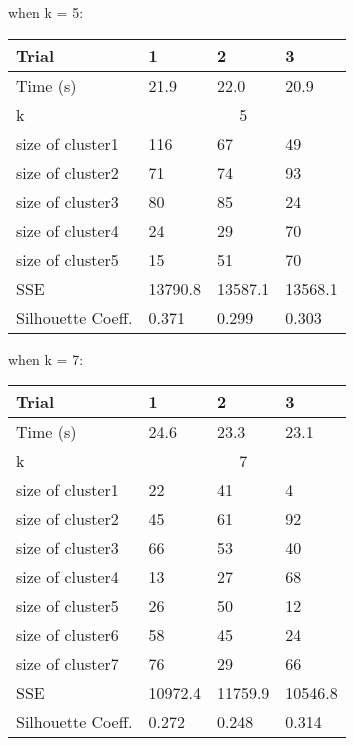 \documentclass[12pt]{article}
\begin{document}
when k = 5:
\begin{table}[h]
\centering
\begin{tabular}{|l|l|l|l|}
\hline
Trial             & 1      & 2      & 3     \\ \hline
Time (s)          & 21.9   & 22.0   & 20.9  \\ \hline
k                 & \multicolumn{3}{c|}{5}  \\ \hline
size of cluster1  & 116    & 67     & 49    \\ \hline
size of cluster2  & 71     & 74    & 93    \\ \hline
size of cluster3  & 80     & 85     & 24    \\ \hline
size of cluster4  & 24     & 29     & 70    \\ \hline
size of cluster5  & 15     & 51     & 70    \\ \hline
SSE               & 13790.8 & 13587.1 & 13568.1  \\ \hline
Silhouette Coeff. & 0.371  & 0.299  & 0.303 \\ \hline
\end{tabular}
\end{table}

\newpage
when k = 7:
\begin{table}[h]
\centering
\begin{tabular}{|l|l|l|l|}
\hline
Trial             & 1      & 2      & 3     \\ \hline
Time (s)          & 24.6   & 23.3   & 23.1  \\ \hline
k                 & \multicolumn{3}{c|}{7}  \\ \hline
size of cluster1  & 22     & 41     & 4    \\ \hline
size of cluster2  & 45     & 61     & 92    \\ \hline
size of cluster3  & 66     & 53     & 40    \\ \hline
size of cluster4  & 13     & 27     & 68    \\ \hline
size of cluster5  & 26     & 50     & 12    \\ \hline
size of cluster6  & 58     & 45     & 24    \\ \hline
size of cluster7  & 76     & 29     & 66    \\ \hline
SSE               & 10972.4 & 11759.9 & 10546.8 \\ \hline
Silhouette Coeff. & 0.272  & 0.248  & 0.314 \\ \hline
\end{tabular}
\end{table}
\end{document}
